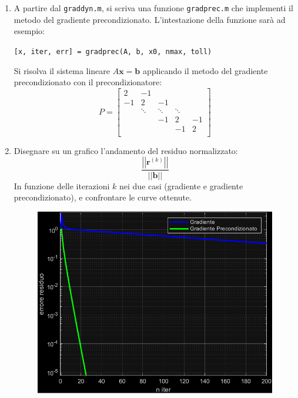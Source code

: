 \begin{enumerate}
    \item A partire dal \texttt{graddyn.m}, si scriva una funzione \texttt{gradprec.m} che implementi il metodo del gradiente precondizionato. L'intestazione della funzione sarà ad esempio:
    \begin{center}
        \texttt{[x, iter, err] = gradprec(A, b, x0, nmax, toll)}
    \end{center}
    Si risolva il sistema lineare $A\mathbf{x} = \mathbf{b}$ applicando il metodo del gradiente precondizionato con il precondizionatore:
    \begin{equation*}
        P = \begin{bmatrix}
            2 & -1 & & & \\
            -1 & 2 & -1 & & \\
             & \ddots & \ddots & \ddots & \\
             & & -1 & 2 & -1 \\
             & & & -1 & 2 \\
        \end{bmatrix}
    \end{equation*}
    
    

    \item Disegnare su un grafico l'andamento del residuo normalizzato:
    \begin{equation*}
        \dfrac{\left|\left| \mathbf{r}^{\left(k\right)} \right|\right|}{\left|\left| \mathbf{b} \right|\right|}
    \end{equation*}
    In funzione delle iterazioni $k$ nei due casi (gradiente e gradiente precondizionato), e confrontare le curve ottenute.
    
    \begin{figure}[!htp]
        \centering
        \includegraphics[width=.7\textwidth]{img/gradiente-2.pdf}
    \end{figure}


\end{enumerate}
